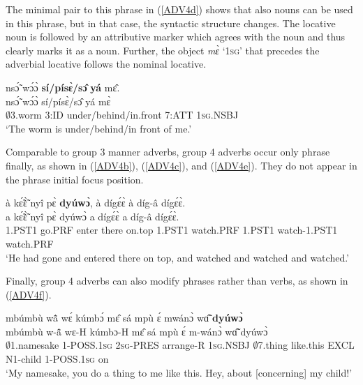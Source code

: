 \noindent The minimal pair to this phrase in (\ref{ADV4d}) shows that also nouns can be used in this phrase, but in that case, the syntactic structure changes. The locative noun is followed by an attributive marker which agrees with the noun and thus clearly marks it as a noun. Further, the object {\itshape mɛ̀} `1\textsc{sg}' that precedes the adverbial locative follows the nominal locative. 

\begin{exe} 
\ex\label{ADV4d}
\glll nsɔ̃́ wɔ́ɔ̀ {\bfseries sí/písɛ̀/sɔ̂} {\bfseries yá} mɛ̂. \\
      nsɔ̃́ wɔ́ɔ̀ sí/písɛ̀/sɔ̂ yá mɛ̀ \\
      $\emptyset$3.worm 3:ID under/behind/in.front 7:ATT 1\textsc{sg}.NSBJ \\
\trans `The worm is under/behind/in front of me.'
\end{exe}

Comparable to group 3 manner adverbs, group 4 adverbs occur only phrase finally, as shown in (\ref{ADV4b}), (\ref{ADV4c}), and (\ref{ADV4e}). They do not appear in the phrase initial focus position.

\begin{exe} 
\ex\label{ADV4e} 
  \glll à kɛ̃́ɛ̃̀ nyî pɛ̀ {\bfseries dyúwɔ̀}, à dígɛ́ɛ̀ à díg-â dígɛ́ɛ̀. \\
       a kɛ̃́ɛ̃̀ nyî pɛ̀ dyúwɔ̀ a dígɛ́ɛ̀ a díg-â dígɛ́ɛ̀. \\
       1.PST1 go.PRF enter there on.top 1.PST1 watch.PRF 1.PST1 watch-1.PST1 watch.PRF \\
    \trans `He had gone and entered there on top, and watched and watched and watched.'
\end{exe}

Finally, group 4 adverbs can also modify phrases rather than verbs, as shown in (\ref{ADV4f}). %

\begin{exe} 
\ex\label{ADV4f}
  \glll mbúmbù wã̂ wɛ́ kúmbɔ́ mɛ̂ sá mpù  ɛ́ mwánɔ̀ wɑ̃̂ {\bfseries dyúwɔ̀}\\
        mbúmbù w-ã̂ wɛ-H kúmbɔ-H mɛ̂ sá mpù ɛ́ m-wánɔ̀ wɑ̃̂ dyúwɔ̀\\
        $\emptyset$1.namesake 1-POSS.1\textsc{sg} 2\textsc{sg}-PRES arrange-R 1\textsc{sg}.NSBJ $\emptyset$7.thing like.this EXCL N1-child 1-POSS.1\textsc{sg} on \\
    \trans `My namesake, you do a thing to me like this. Hey, about [concerning] my child!'
\end{exe}





